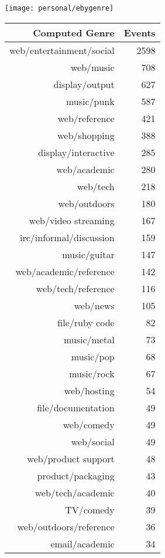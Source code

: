 \begin{table}[ht]
    \centering

    \texttt{[image: personal/ebygenre]}

    \vspace{10pt}

    \small
    \begin{tabular}{r r}
      \hline
      Computed Genre & Events \\ 
      \hline
      web/entertainment/social & 2598 \\ 
      web/music & 708 \\ 
      display/output & 627 \\ 
      music/punk & 587 \\ 
      web/reference & 421 \\ 
      web/shopping & 388 \\ 
      display/interactive & 285 \\ 
      web/academic & 280 \\ 
      web/tech & 218 \\ 
      web/outdoors & 180 \\ 
      web/video streaming & 167 \\ 
      irc/informal/discussion & 159 \\ 
      music/guitar & 147 \\ 
      web/academic/reference & 142 \\ 
      web/tech/reference & 116 \\ 
      web/news & 105 \\ 
      file/ruby code &  82 \\ 
      music/metal &  73 \\ 
      music/pop &  68 \\ 
      music/rock &  67 \\ 
      web/hosting &  54 \\ 
      file/documentation &  49 \\ 
      web/comedy &  49 \\ 
      web/social &  49 \\ 
      web/product support &  48 \\ 
      product/packaging &  43 \\ 
      web/tech/academic &  40 \\ 
      TV/comedy &  39 \\ 
      web/outdoors/reference &  36 \\ 
      email/academic &  34 \\ 

\end{tabular}
\end{table}
